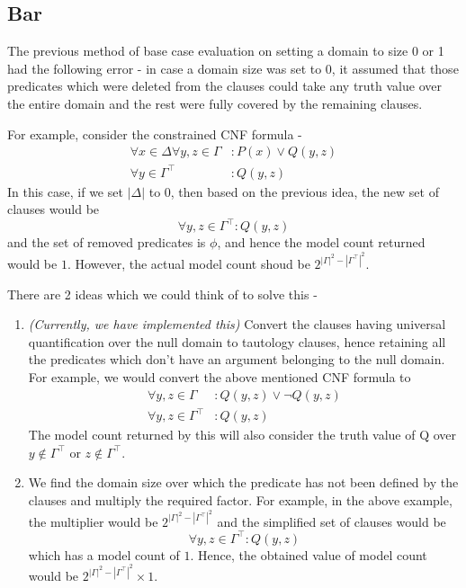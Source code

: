 \documentclass{article}
\begin{document}
\subsection{Bar}

The previous method of base case evaluation on setting a domain to size 0 or 1
had the following error - in case a domain size was set to 0, it assumed that
those predicates which were deleted from the clauses could take any truth value
over the entire domain and the rest were fully covered by the remaining clauses.

For example, consider the constrained CNF formula -
\begin{align}
  \forall x \in \Delta \forall y, z \in \Gamma &: P(x) \lor Q(y, z) \\
  \forall y \in \Gamma^\top &: Q(y, z)
\end{align}
In this case, if we set $|\Delta|$ to $0$, then based on the previous idea, the
new set of clauses would be
\begin{equation}
  \forall y, z \in \Gamma^\top : Q(y, z)
\end{equation}
and the set of removed predicates is $\phi$, and hence the model count returned
would be $1$. However, the actual model count shoud be
$2^{|\Gamma|^2 - |\Gamma^\top|^2}$.

There are 2 ideas which we could think of to solve this -
\begin{enumerate}
  \item \textit{(Currently, we have implemented this)} Convert the clauses
        having universal quantification over the null domain to tautology
        clauses, hence retaining all the predicates which don't have an argument
        belonging to the null domain. For example, we would convert the above
        mentioned CNF formula to
        \begin{align}
          \forall y, z \in \Gamma &: Q(y, z) \lor \neg Q(y, z) \\
          \forall y, z \in \Gamma^\top &: Q(y, z)
        \end{align}
        The model count returned by this will also consider the truth value of Q
        over $y \not \in \Gamma^\top$ or $z \not \in \Gamma^\top$.
  \item We find the domain size over which the predicate has not been defined by
        the clauses and multiply the required factor. For example, in the above
        example, the multiplier would be $2^{|\Gamma|^2 - |\Gamma^\top|^2}$ and
        the simplified set of clauses would be
        \begin{equation}
          \forall y, z \in \Gamma^\top : Q(y, z)
        \end{equation}
        which has a model count of $1$. Hence, the obtained value of model count
        would be $2^{|\Gamma|^2 - |\Gamma^\top|^2} \times 1$.
\end{enumerate}
\end{document}
